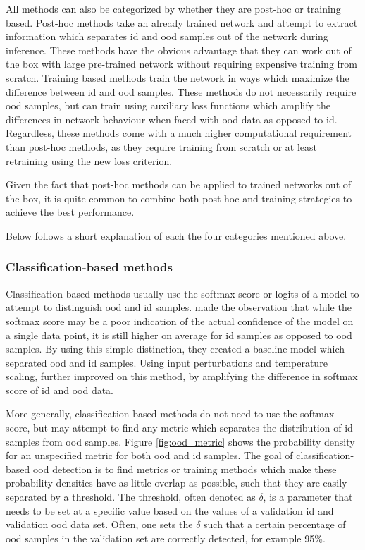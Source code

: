 \documentclass[UKenglish]{uiomasterthesis} %
\theoremstyle{definition}
\begin{document}
All methods can also be categorized by whether they are post-hoc or training based. Post-hoc methods take an already trained network and attempt to extract information which separates \ac{id} and \ac{ood} samples out of the network during inference. These methods have the obvious advantage that they can work out of the box with large pre-trained network without requiring expensive training from scratch. Training based methods train the network in ways which maximize the difference between \ac{id} and \ac{ood} samples. These methods do not necessarily require \ac{ood} samples, but can train using auxiliary loss functions which amplify the differences in network behaviour when faced with \ac{ood} data as opposed to \ac{id}. Regardless, these methods come with a much higher computational requirement than post-hoc methods, as they require training from scratch or at least retraining using the new loss criterion. 

Given the fact that post-hoc methods can be applied to trained networks out of the box, it is quite common to combine both post-hoc and training strategies to achieve the best performance.


Below follows a short explanation of each the four categories mentioned above.
\\

\subsubsection{Classification-based methods}

Classification-based methods usually use the softmax score or logits of a model to attempt to distinguish \ac{ood} and \ac{id} samples. \cite{oodbaseline} made the observation that while the softmax score may be a poor indication of the actual confidence of the model on a single data point, it is still higher on average for \ac{id} samples as opposed to \ac{ood} samples. By using this simple distinction, they created a baseline model which separated \ac{ood} and \ac{id} samples. Using input perturbations and temperature scaling, \cite{odin} further improved on this method, by amplifying the difference in softmax score of \ac{id} and \ac{ood} data. 

More generally, classification-based methods do not need to use the softmax score, but may attempt to find any metric which separates the distribution of \ac{id} samples from \ac{ood} samples. Figure \ref{fig:ood_metric} shows the probability density for an unspecified metric for both \ac{ood} and \ac{id} samples. The goal of classification-based \ac{ood} detection is to find metrics or training methods which make these probability densities have as little overlap as possible, such that they are easily separated by a threshold. The threshold, often denoted as $\delta$, is a parameter that needs to be set at a specific value based on the values of a validation \ac{id} and validation \ac{ood} data set. Often, one sets the $\delta$ such that a certain percentage of \ac{ood} samples in the validation set are correctly detected, for example 95\%.
\end{document}
